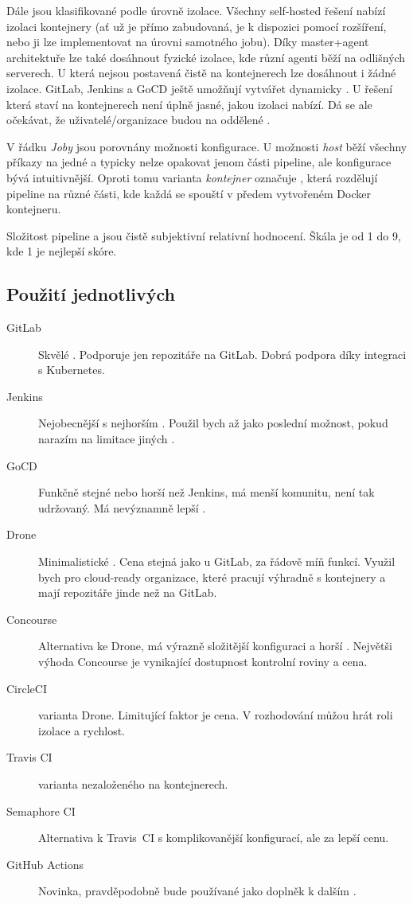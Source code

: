     Dále jsou \CI klasifikované podle úrovně izolace. Všechny self-hosted řešení nabízí izolaci kontejnery (ať už je přímo zabudovaná, je k dispozici pomocí rozšíření, nebo ji lze implementovat na úrovni samotného jobu). Díky master+agent architektuře lze také dosáhnout fyzické izolace, kde různí agenti běží na odlišných serverech. U \CI která nejsou postavená čistě na kontejnerech lze dosáhnout i žádné izolace. GitLab, Jenkins a GoCD ještě umožňují vytvářet dynamicky . U  řešení která staví na kontejnerech není úplně jasné, jakou izolaci nabízí. Dá se ale očekávat, že uživatelé/organizace budou na oddělené .

    V řádku \textit{Joby} jsou porovnány možnosti konfigurace. U možnosti \textit{host} běží všechny příkazy na jedné  a typicky nelze opakovat jenom části pipeline, ale konfigurace bývá intuitivnější. Oproti tomu varianta \textit{kontejner} označuje \CI, která rozdělují pipeline na různé části, kde každá se spouští v předem vytvořeném Docker kontejneru.

    Složitost pipeline a  jsou čistě subjektivní relativní hodnocení. Škála je od 1 do 9, kde 1 je nejlepší skóre.

    \subsection{Použití jednotlivých \CI}
        \begin{description}
            \item[GitLab] Skvělé \CI. Podporuje jen repozitáře na GitLab. Dobrá podpora \CD díky integraci s Kubernetes.
            \item[Jenkins] Nejobecnější \CI s nejhorším . Použil bych až jako poslední možnost, pokud narazím na limitace jiných \CI.
            \item[GoCD] Funkčně stejné nebo horší než Jenkins, má menší komunitu, není tak udržovaný. Má nevýznamně lepší .
            \item[Drone] Minimalistické \CI. Cena stejná jako u GitLab, za řádově míň funkcí. Využil bych pro cloud-ready organizace, které pracují výhradně s kontejnery a mají repozitáře jinde než na GitLab.
            \item[Concourse] Alternativa ke Drone, má výrazně složitější konfiguraci a horší . Největši výhoda Concourse je vynikající dostupnost kontrolní roviny a cena.
            \item[CircleCI]  varianta Drone. Limitující faktor je cena. V rozhodování můžou hrát roli izolace a rychlost.
            \item[Travis CI]  varianta \CI nezaloženého na kontejnerech.
            \item[Semaphore CI] Alternativa k Travis~CI s komplikovanější konfigurací, ale za lepší cenu.
            \item[GitHub Actions] Novinka, pravděpodobně bude používané jako doplněk k dalším \CI.
        \end{description}
